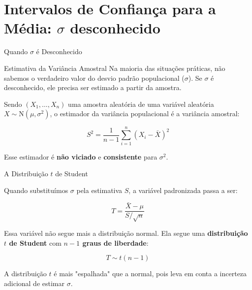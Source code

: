 \documentclass[14pt,aspectratio=1610]{beamer}
\begin{document}
	
	
\section{Intervalos de Confiança para a Média: $\sigma$ desconhecido}

\begin{frame}{Quando $\sigma$ é Desconhecido}
	\small
	\begin{block}{Estimativa da Variância Amostral}
		\justifying
		Na maioria das situações práticas, não sabemos o verdadeiro valor do desvio padrão populacional ($\sigma$). Se $\sigma$ é desconhecido, ele precisa ser estimado a partir da amostra.
		
		Sendo $(X_1, \ldots, X_n)$ uma amostra aleatória de uma variável aleatória $X \sim \text{N}(\mu, \sigma^2)$, o estimador da variância populacional é a variância amostral:
		
		\[
		S^2 = \frac{1}{n-1} \sum_{i=1}^n (X_i - \bar{X})^2
		\]
		
		Esse estimador é \textbf{não viciado} e \textbf{consistente} para $\sigma^2$.
	\end{block}
\end{frame}

\begin{frame}{A Distribuição $t$ de Student}
	\small
	\begin{block}{}
		\justifying
		Quando substituímos $\sigma$ pela estimativa $S$, a variável padronizada passa a ser:
		
		\[
		T = \frac{\bar{X} - \mu}{S / \sqrt{n}}
		\]
		
		Essa variável não segue mais a distribuição normal. Ela segue uma \textbf{distribuição $t$ de Student} com \textbf{$n-1$ graus de liberdade}:
		
		\[
		T \sim t(n-1)
		\]
		
		A distribuição $t$ é mais "espalhada" que a normal, pois leva em conta a incerteza adicional de estimar $\sigma$.
	\end{block}
\end{frame}
\end{document}
